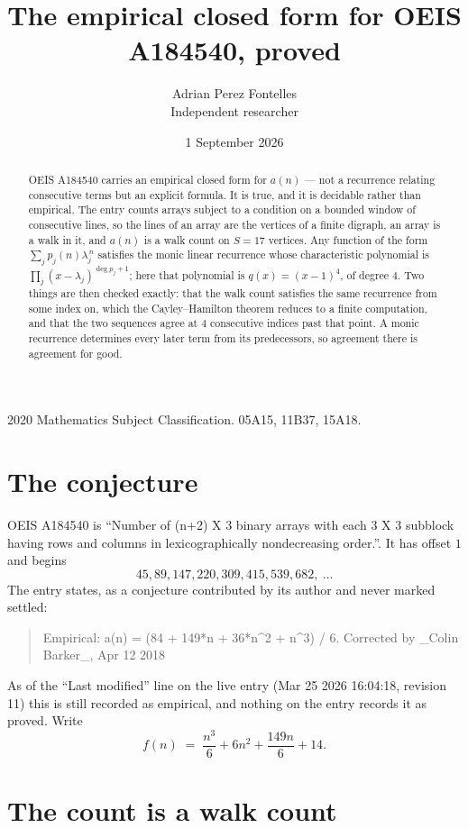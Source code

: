\documentclass[11pt,a4paper]{article}
\title{The empirical closed form for OEIS A184540, proved}
\author{Adrian Perez Fontelles\\ \small Independent researcher}
\date{1 September 2026}
\theoremstyle{plain}
\theoremstyle{definition}
\begin{document}
\maketitle

\begin{abstract}
OEIS A184540 carries an empirical closed form for $a(n)$ --- not a recurrence relating
consecutive terms but an explicit formula. It is true, and it is decidable rather than
empirical. The entry counts arrays subject to a condition on a bounded window of consecutive lines, so the lines of an array are the
vertices of a finite digraph, an array is a walk in it, and $a(n)$ is a walk count on
$S=17$ vertices. Any function of the form $\sum_j p_j(n)\lambda_j^{\,n}$ satisfies the
monic linear recurrence whose characteristic polynomial is
$\prod_j(x-\lambda_j)^{\deg p_j+1}$; here that polynomial is $q(x)=(x-1)^{4}$, of degree
$4$. Two things are then checked exactly: that the walk count satisfies the same
recurrence from some index on, which the Cayley--Hamilton theorem reduces to a finite
computation, and that the two sequences agree at $4$ consecutive indices past that
point. A monic recurrence determines every later term from its predecessors, so agreement
there is agreement for good.
\end{abstract}

\noindent\small 2020 Mathematics Subject Classification. 05A15, 11B37, 15A18.\normalsize

\section{The conjecture}

OEIS A184540 is ``Number of (n+2) X 3 binary arrays with each 3 X 3 subblock having rows and columns in lexicographically nondecreasing order.''. It has offset $1$ and begins
\[
45, 89, 147, 220, 309, 415, 539, 682,\ \dots
\]
The entry states, as a conjecture contributed by its author and never marked settled:
\begin{quote}
Empirical: a(n) = (84 + 149*n + 36*n\^{}2 + n\^{}3) / 6. Corrected by \_Colin Barker\_, Apr 12 2018
\end{quote}
As of the ``Last modified'' line on the live entry (Mar 25 2026 16:04:18, revision 11) this is still
recorded as empirical, and nothing on the entry records it as proved. Write
\[
f(n)\;=\;\frac{n^{3}}{6} + 6 n^{2} + \frac{149 n}{6} + 14.
\]

\section{The count is a walk count}
\end{document}
